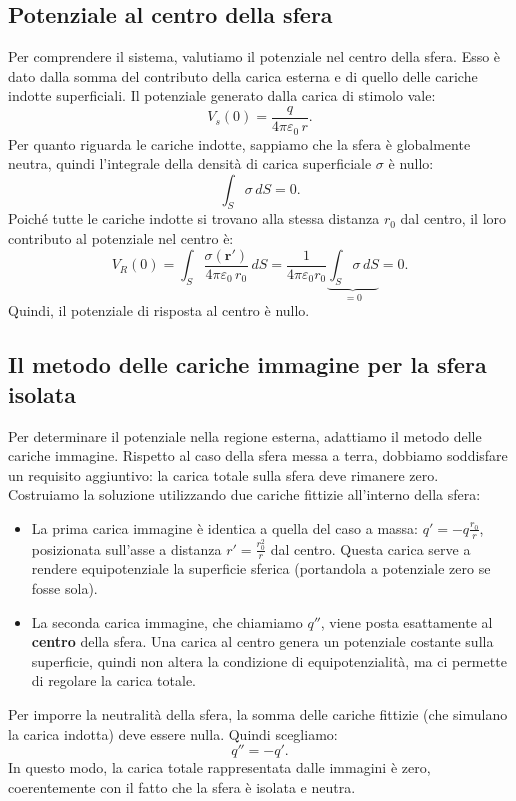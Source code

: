 \documentclass{book}
\begin{document}
\subsection*{Potenziale al centro della sfera}
Per comprendere il sistema, valutiamo il potenziale nel centro della sfera. Esso è dato dalla somma del contributo della carica esterna e di quello delle cariche indotte superficiali.
Il potenziale generato dalla carica di stimolo vale:
\[
V_s(0)=\frac{q}{4\pi\varepsilon_0\,r}.
\]
Per quanto riguarda le cariche indotte, sappiamo che la sfera è globalmente neutra, quindi l'integrale della densità di carica superficiale \(\sigma\) è nullo:
\[
\int_{S}\sigma\,dS = 0.
\]
Poiché tutte le cariche indotte si trovano alla stessa distanza \(r_0\) dal centro, il loro contributo al potenziale nel centro è:
\[
V_R(0)=\int_{S}\frac{\sigma(\mathbf r')}{4\pi\varepsilon_0\,r_0}\,dS
= \frac{1}{4\pi\varepsilon_0 r_0}\underbrace{\int_{S}\sigma\,dS}_{=0} = 0.
\]
Quindi, il potenziale di risposta al centro è nullo.

\subsection*{Il metodo delle cariche immagine per la sfera isolata}
Per determinare il potenziale nella regione esterna, adattiamo il metodo delle cariche immagine. Rispetto al caso della sfera messa a terra, dobbiamo soddisfare un requisito aggiuntivo: la carica totale sulla sfera deve rimanere zero.
Costruiamo la soluzione utilizzando due cariche fittizie all'interno della sfera:
\begin{itemize}
  \item La prima carica immagine è identica a quella del caso a massa: $q'=-q\frac{r_0}{r}$, posizionata sull'asse a distanza $r'=\frac{r_0^2}{r}$ dal centro. Questa carica serve a rendere equipotenziale la superficie sferica (portandola a potenziale zero se fosse sola).
  \item La seconda carica immagine, che chiamiamo $q''$, viene posta esattamente al \textbf{centro} della sfera. Una carica al centro genera un potenziale costante sulla superficie, quindi non altera la condizione di equipotenzialità, ma ci permette di regolare la carica totale.
\end{itemize}

Per imporre la neutralità della sfera, la somma delle cariche fittizie (che simulano la carica indotta) deve essere nulla. Quindi scegliamo:
\[
q''=-q'.
\]
In questo modo, la carica totale rappresentata dalle immagini è zero, coerentemente con il fatto che la sfera è isolata e neutra.
\end{document}
